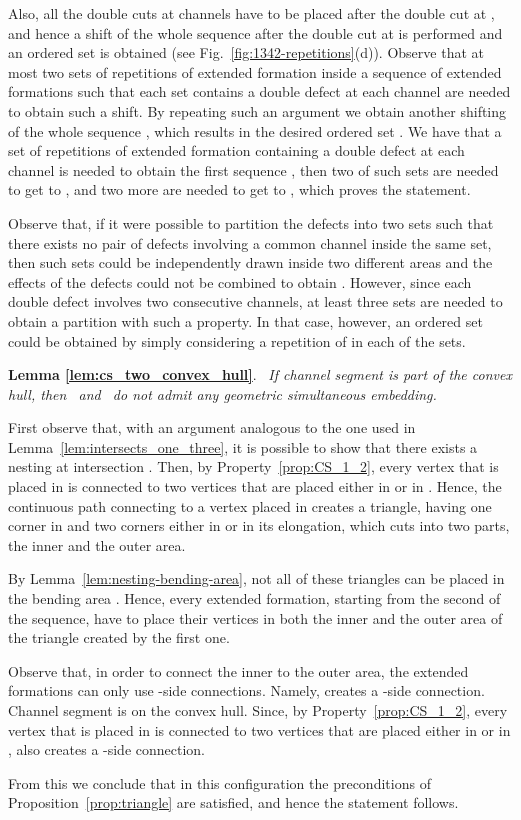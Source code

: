 \documentclass[a4paper,10pt]{llncs}
\newcounter{prop}
\renewenvironment{proof}
{{\bf Proof:}}{\hspace*{\fill}\par\vspace{2mm}}
\newcommand{\rephrase}[3]{\noindent\textbf{#1 #2}.~\emph{#3}}
\newcommand{\T}{\mbox{ }}
\renewcommand{\P}{\mbox{ }}
\begin{document}
\begin{proof}
\clearpage

Also, all the double cuts at channels  have to be placed after the double cut at , and hence a shift of the whole sequence  after the double cut at  is performed and an ordered set  is obtained (see Fig.~\ref{fig:1342-repetitions}(d)). Observe that at most two sets of repetitions of extended formation inside a sequence of extended formations such that each set contains a double defect at each channel are needed to obtain such a shift. By repeating such an argument we obtain another shifting of the whole sequence , which results in the desired ordered set . We have that a set of repetitions of extended formation containing a double defect at each channel is needed to obtain the first sequence , then two of such sets are needed to get to , and two more are needed to get to , which proves the statement.

Observe that, if it were possible to partition the defects into two sets such that there exists no pair of defects involving a common channel inside the same set, then such sets could be independently drawn inside two different areas and the effects of the defects could not be combined to obtain . However, since each double defect involves two consecutive channels, at least three sets are needed to obtain a partition with such a property. In that case, however, an ordered set  could be obtained by simply considering a repetition of  in each of the sets.
\end{proof}

\rephrase{Lemma}{\ref{lem:cs_two_convex_hull}}{
If channel segment  is part of the convex hull, then \T and \P do not admit any geometric simultaneous embedding.
}

\begin{proof}
First observe that, with an argument analogous to the one used in Lemma~\ref{lem:intersects_one_three}, it is possible to show that there exists a nesting at intersection . Then, by Property~\ref{prop:CS_1_2}, every vertex that is placed in  is connected to two vertices that are placed either in  or in . Hence, the continuous path connecting to a vertex placed in  creates a triangle, having one corner in  and two corners either in  or in its elongation, which cuts  into two parts, the inner and the outer area.

By Lemma~\ref{lem:nesting-bending-area}, not all of these triangles can be placed in the bending area . Hence, every extended formation, starting from the second of the sequence, have to place their vertices in both the inner and the outer area of the triangle created by the first one.

Observe that, in order to connect the inner to the outer area, the extended formations can only use -side connections. Namely,  creates a -side connection. Channel segment  is on the convex hull. Since, by Property~\ref{prop:CS_1_2}, every vertex that is placed in  is connected to two vertices that are placed either in  or in , also  creates a -side connection.

From this we conclude that in this configuration the preconditions of Proposition~\ref{prop:triangle} are satisfied, and hence the statement follows.
\end{proof}
\end{document}
